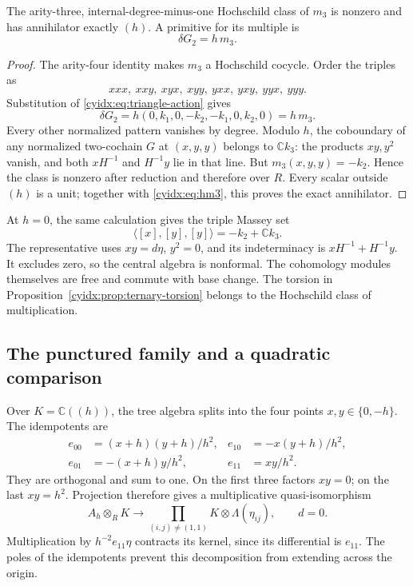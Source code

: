 \begin{proposition}\label{cyidx:prop:ternary-torsion}
The arity-three, internal-degree-minus-one Hochschild
class of \(m_3\) is nonzero and has annihilator exactly
\((h)\). A primitive for its multiple is
\begin{equation}\label{cyidx:eq:hm3}
                      \delta G_2=h\,m_3.
\end{equation}
\end{proposition}
\begin{proof}
The arity-four identity makes \(m_3\) a Hochschild
cocycle. Order the triples as
\[
                 xxx,\ xxy,\ xyx,\ xyy,\ yxx,\ yxy,\ yyx,\ yyy.
\]
Substitution of \eqref{cyidx:eq:triangle-action} gives
\[
 \delta G_2=h(0,k_1,0,-k_2,-k_1,0,k_2,0)=h\,m_3.
\]
Every other normalized pattern vanishes by degree.
Modulo \(h\), the coboundary of any normalized
two-cochain \(G\) at \((x,y,y)\) belongs to
\(\mathbb C k_3\): the products \(xy,y^2\) vanish,
and both \(xH^{-1}\) and \(H^{-1}y\) lie in that
line. But \(m_3(x,y,y)=-k_2\). Hence the class is
nonzero after reduction and therefore over \(R\).
Every scalar outside \((h)\) is a unit; together
with \eqref{cyidx:eq:hm3}, this proves the exact
annihilator.
\end{proof}

At \(h=0\), the same calculation gives the triple
Massey set
\begin{equation}\label{cyidx:eq:Massey}
            \langle[x],[y],[y]\rangle=-k_2+\mathbb C k_3.
\end{equation}
The representative uses \(xy=d\eta\), \(y^2=0\),
and its indeterminacy is \(xH^{-1}+H^{-1}y\).
It excludes zero, so the central algebra is nonformal.
The cohomology modules themselves are free and commute
with base change. The torsion in
Proposition~\ref{cyidx:prop:ternary-torsion} belongs
to the Hochschild class of multiplication.

\subsection{The punctured family and a quadratic comparison}

Over \(K=\mathbb C((h))\), the tree algebra splits into
the four points \(x,y\in\{0,-h\}\). The idempotents are
\begin{equation}\label{cyidx:eq:idempotents}
 \begin{aligned}
 e_{00}&=(x+h)(y+h)/h^2,& e_{10}&=-x(y+h)/h^2,\\
 e_{01}&=-(x+h)y/h^2,& e_{11}&=xy/h^2.
 \end{aligned}
\end{equation}
They are orthogonal and sum to one. On the first three
factors \(xy=0\); on the last \(xy=h^2\).
Projection therefore gives a multiplicative
quasi-isomorphism
\begin{equation}\label{cyidx:eq:generic-triangle}
 A_h\otimes_R K\longrightarrow
       \prod_{(i,j)\ne(1,1)}K\otimes\Lambda(\eta_{ij}),
                    \qquad d=0.
\end{equation}
Multiplication by \(h^{-2}e_{11}\eta\) contracts its
kernel, since its differential is \(e_{11}\).
The poles of the idempotents prevent this decomposition
from extending across the origin.

